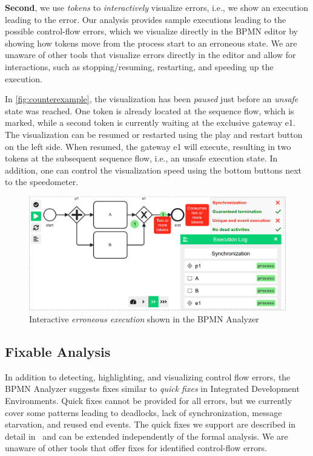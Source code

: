 \documentclass[
twocolumn
]{ceurart}
\begin{document}
\textbf{Second}, we use \textit{tokens} to \textit{interactively} visualize errors, i.e., we show an execution leading to the error.
Our analysis provides sample executions leading to the possible control-flow errors, which we visualize directly in the BPMN editor by showing how tokens move from the process start to an erroneous state.
We are unaware of other tools that visualize errors directly in the editor and allow for interactions, such as stopping/resuming, restarting, and speeding up the execution.

In \autoref{fig:counterexample}, the visualization has been \textit{paused} just before an \textit{unsafe} state was reached.
One token is already located at the sequence flow, which is marked, while a second token is currently waiting at the exclusive gateway \textsf{e1}.
The visualization can be resumed or restarted using the play and restart button on the left side.
When resumed, the gateway \textsf{e1} will execute, resulting in two tokens at the subsequent sequence flow, i.e., an unsafe execution state.
In addition, one can control the visualization speed using the bottom buttons next to the speedometer.

\begin{figure}[ht]
	\centering
	\includegraphics[width=1\linewidth]{images/counter-example}
	\caption{Interactive \textit{erroneous execution} shown in the BPMN Analyzer}
	\label{fig:counterexample}
\end{figure}

\subsection{Fixable Analysis}
In addition to detecting, highlighting, and visualizing control flow errors, the BPMN Analyzer suggests fixes similar to \textit{quick fixes} in Integrated Development Environments.
Quick fixes cannot be provided for all errors, but we currently cover some patterns leading to deadlocks, lack of synchronization, message starvation, and reused end events.
The quick fixes we support are described in detail in~\cite{krauterInstantaneousComprehensibleFixable2024} and can be extended independently of the formal analysis.
We are unaware of other tools that offer fixes for identified control-flow errors.
\end{document}
